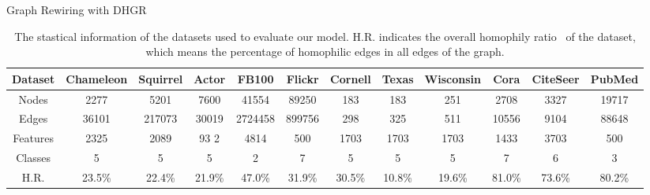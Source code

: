 \documentclass[sigconf]{acmart}
\begin{document}
	\begin{algorithm}
		\caption{Graph Rewiring with DHGR}
		\label{algorithm_GR}
		\LinesNumbered
	\end{algorithm}
	
	\begin{table*}
		\centering
		\setlength{\tabcolsep}{6.8pt}
		\caption{The stastical information of the datasets used to evaluate our model. H.R. indicates the overall homophily ratio~\cite{pei2020geom} of the dataset, which means the percentage of homophilic edges in all edges of the graph.}
		\label{tab:data_info}
		\begin{tabular}{cccccccccccc}
			\toprule
			Dataset & Chameleon & Squirrel & Actor& FB100 & Flickr  & Cornell & Texas & Wisconsin & Cora & CiteSeer & PubMed  \\
			\midrule
			Nodes & 2277 & 5201 & 7600& 41554 & 89250 & 183 & 183 & 251  & 2708 & 3327 & 19717 \\
			Edges & 36101 & 217073 & 30019 & 2724458 & 899756  & 298 & 325 & 511 & 10556 & 9104 & 88648 \\
			Features & 2325 & 2089 & 93 2& 4814 & 500  & 1703 & 1703 & 1703  & 1433 & 3703  & 500\\
			Classes & 5 & 5 & 5 & 2 & 7 & 5 & 5 & 5 & 7 & 6 &  3\\
			H.R. & 23.5\% & 22.4\% & 21.9\%  & 47.0\%& 31.9\% & 30.5\% & 10.8\% & 19.6\% & 81.0\% & 73.6\% & 80.2\%  \\
			\bottomrule
		\end{tabular}
	\end{table*}
	
	
\end{document}
